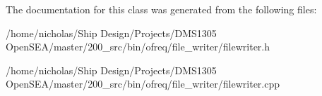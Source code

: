 The documentation for this class was generated from the following files\-:\begin{DoxyCompactItemize}
\item 
/home/nicholas/\-Ship Design/\-Projects/\-D\-M\-S1305 Open\-S\-E\-A/master/200\-\_\-src/bin/ofreq/file\-\_\-writer/filewriter.\-h\item 
/home/nicholas/\-Ship Design/\-Projects/\-D\-M\-S1305 Open\-S\-E\-A/master/200\-\_\-src/bin/ofreq/file\-\_\-writer/filewriter.\-cpp\end{DoxyCompactItemize}

